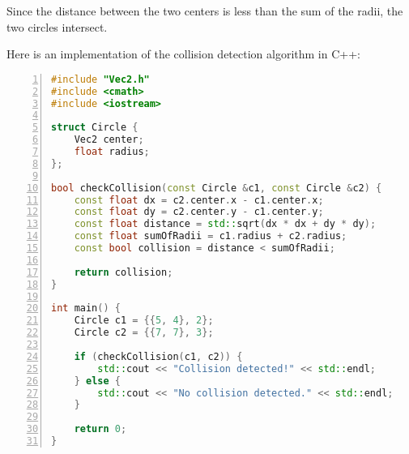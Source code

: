 Since the distance between the two centers is less than the sum of the radii,
the two circles intersect.

\newpage
{}
Here is an implementation of the collision detection algorithm in C++:
\vspace{1em}
\begin{mdframed}[linecolor=black!30!white,linewidth=.5pt,extratopheight=3em]
    \begin{lstlisting}[language=C++, aboveskip=3mm,
        belowskip=3mm,
        showstringspaces=false,
        columns=flexible,
        basicstyle={\small\ttfamily},
        numbers=left,
        numberstyle=\tiny\color{gray},
        keywordstyle=\color{blue},
        commentstyle=\color{dkgreen},
        stringstyle=\color{mauve},
        breaklines=true,
        breakatwhitespace=true,
        tabsize=3,
        xleftmargin=1em]
#include "Vec2.h"
#include <cmath>
#include <iostream>

struct Circle {
    Vec2 center;
    float radius;
};

bool checkCollision(const Circle &c1, const Circle &c2) {
    const float dx = c2.center.x - c1.center.x;
    const float dy = c2.center.y - c1.center.y;
    const float distance = std::sqrt(dx * dx + dy * dy);
    const float sumOfRadii = c1.radius + c2.radius;
    const bool collision = distance < sumOfRadii;

    return collision;
}

int main() {
    Circle c1 = {{5, 4}, 2};
    Circle c2 = {{7, 7}, 3};

    if (checkCollision(c1, c2)) {
        std::cout << "Collision detected!" << std::endl;
    } else {
        std::cout << "No collision detected." << std::endl;
    }

    return 0;
}
\end{lstlisting}

\end{mdframed}

\newpage
